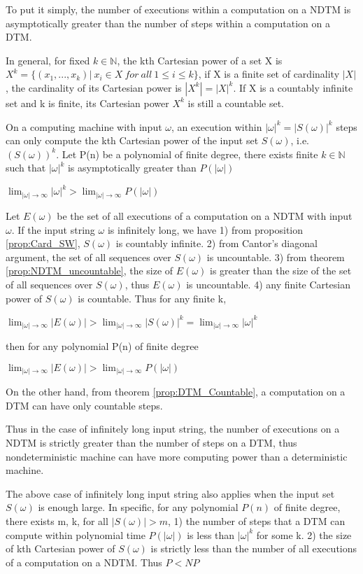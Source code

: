\documentclass[final,leqno]{siamltex}
\begin{document}
To put it simply, the number of executions within a computation on a NDTM is asymptotically greater than the number of steps within a computation on a DTM.

In general, for fixed $k\in\mathbb{N}$, the kth Cartesian power of a set X is $X^k=\{(x_1,...,x_k)|~ x_i\in X~ for~ all~ 1\le i\le k\}$, if X is a finite set of cardinality $|X|$, the cardinality of its Cartesian power is $|X^k|=|X|^k$. If X is a countably infinite set and k is finite, its Cartesian power $X^k$ is still a countable set.

On a computing machine with input $\omega$, an execution within $|\omega|^k=|S(\omega)|^k$ steps can only compute the kth Cartesian power of the input set $S(\omega)$, i.e. $(S(\omega))^k$. Let P(n) be a polynomial of finite degree, there exists finite $k\in\mathbb{N}$ such that $|\omega|^k$ is asymptotically greater than $P(|\omega|)$

$\lim_{|\omega|\rightarrow\infty}|\omega|^k > \lim_{|\omega|\rightarrow\infty}P(|\omega|)$

Let $E(\omega)$ be the set of all executions of a computation on a NDTM with input $\omega$. If the input string $\omega$ is infinitely long, we have 1) from proposition \ref{prop:Card_SW}, $S(\omega)$ is countably infinite. 2) from Cantor's diagonal argument, the set of all sequences over $S(\omega)$ is uncountable. 3) from theorem \ref{prop:NDTM_uncountable}, the size of $E(\omega)$ is greater than the size of the set of all sequences over $S(\omega)$, thus $E(\omega)$ is uncountable. 4) any finite Cartesian power of $S(\omega)$ is countable. Thus for any finite k,

$\lim_{|\omega|\rightarrow \infty}|E(\omega)|>\lim_{|\omega|\rightarrow \infty}|S(\omega)|^k=\lim_{|\omega|\rightarrow \infty}|\omega|^k$

then for any polynomial P(n) of finite degree

$\lim_{|\omega|\rightarrow \infty}|E(\omega)|>\lim_{|\omega|\rightarrow \infty}P(|\omega|)$

On the other hand, from theorem \ref{prop:DTM_Countable}, a computation on a DTM can have only countable steps.

Thus in the case of infinitely long input string, the number of executions on a NDTM is strictly greater than the number of steps on a DTM, thus nondeterministic machine can have more computing power than a deterministic machine.

The above case of infinitely long input string also applies when the input set $S(\omega)$ is enough large. In specific, for any polynomial $P(n)$ of finite degree, there exists m, k, for all $|S(\omega)|>m$, 1) the number of steps that a DTM can compute within polynomial time $P(|\omega|)$ is less than $|\omega|^k$ for some k. 2)  the size of kth Cartesian power of $S(\omega)$ is strictly less than the number of all executions of a computation on a NDTM. Thus $P<NP$
\end{document}

